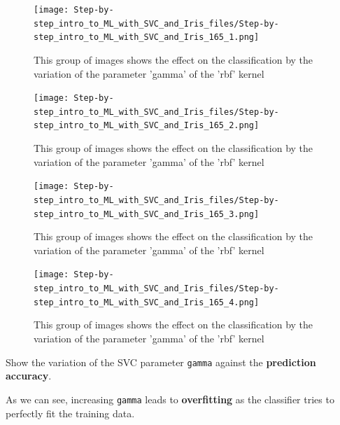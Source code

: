 \documentclass [oneside,10pt,a4paper,ngerman,BCOR10mm,headsepline,parindent,final]{scrartcl}
\begin{document}
    \begin{figure}
        \begin{center}\texttt{[image: Step-by-step\_intro\_to\_ML\_with\_SVC\_and\_Iris\_files/Step-by-step\_intro\_to\_ML\_with\_SVC\_and\_Iris\_165\_1.png]}\end{center}
        \caption{This group of images shows the effect on the classification by the variation of the parameter 'gamma' of the 'rbf' kernel}
        \label{fig:vary_gamma_parameter}
    \end{figure}
    
    \begin{figure}
        \begin{center}\texttt{[image: Step-by-step\_intro\_to\_ML\_with\_SVC\_and\_Iris\_files/Step-by-step\_intro\_to\_ML\_with\_SVC\_and\_Iris\_165\_2.png]}\end{center}
        \caption{This group of images shows the effect on the classification by the variation of the parameter 'gamma' of the 'rbf' kernel}
        \label{fig:vary_gamma_parameter}
    \end{figure}
    
    \begin{figure}
        \begin{center}\texttt{[image: Step-by-step\_intro\_to\_ML\_with\_SVC\_and\_Iris\_files/Step-by-step\_intro\_to\_ML\_with\_SVC\_and\_Iris\_165\_3.png]}\end{center}
        \caption{This group of images shows the effect on the classification by the variation of the parameter 'gamma' of the 'rbf' kernel}
        \label{fig:vary_gamma_parameter}
    \end{figure}
    
    \begin{figure}
        \begin{center}\texttt{[image: Step-by-step\_intro\_to\_ML\_with\_SVC\_and\_Iris\_files/Step-by-step\_intro\_to\_ML\_with\_SVC\_and\_Iris\_165\_4.png]}\end{center}
        \caption{This group of images shows the effect on the classification by the variation of the parameter 'gamma' of the 'rbf' kernel}
        \label{fig:vary_gamma_parameter}
    \end{figure}
    
    Show the variation of the SVC parameter \texttt{gamma} against the
\textbf{prediction accuracy}.

As we can see, increasing \texttt{gamma} leads to \textbf{overfitting}
as the classifier tries to perfectly fit the training data.
\end{document}
